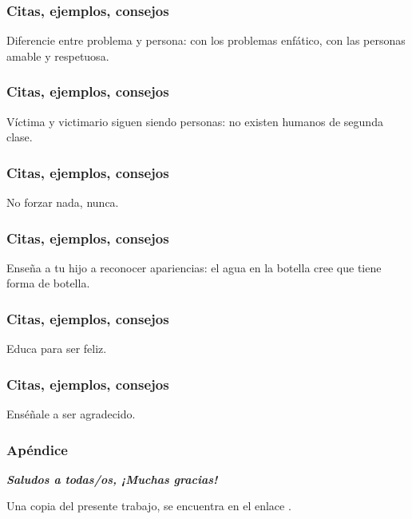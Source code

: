\documentclass[12pt,spanish,x11names,svgnames]{beamer}
\def\talkpubpdf{copyurlfromrepository}
\newcommand{\framedhref}[2]{\href{#1}{\fcolorbox{bluu}{bluu}{\textcolor{white}{#2}}}}
\begin{document}
\begin{frame}
  \frametitle{Citas, ejemplos, consejos}
  \begin{block}{}
    Diferencie entre problema y persona: con los problemas enfático, con las personas amable y respetuosa.
  \end{block}
\end{frame}
\begin{frame}
  \frametitle{Citas, ejemplos, consejos}
  \begin{block}{}
    Víctima y victimario siguen siendo personas: no existen humanos de segunda clase.
  \end{block}
\end{frame}
\begin{frame}
  \frametitle{Citas, ejemplos, consejos}
  \begin{block}{}
    No forzar nada, nunca.
  \end{block}
\end{frame}
\begin{frame}
  \frametitle{Citas, ejemplos, consejos}
  \begin{block}{}
    Enseña a tu hijo a reconocer apariencias: el agua en la botella cree que tiene forma de botella.
  \end{block}
\end{frame}
\begin{frame}
  \frametitle{Citas, ejemplos, consejos}
  \begin{block}{}
    Educa para ser feliz.
  \end{block}
\end{frame}
\begin{frame}
  \frametitle{Citas, ejemplos, consejos}
  \begin{block}{}
    Enséñale a ser agradecido.
  \end{block}
\end{frame}
\begin{frame}[c]\frametitle{Apéndice}
\centering\decofourleft\quad\decofourright

\textbf{\emph {Saludos a todas/os, ¡Muchas gracias!}}

Una copia del presente trabajo, se encuentra en el enlace \framedhref{\talkpubpdf}{\talkpubpdf}.

\end{frame}
\end{document}
